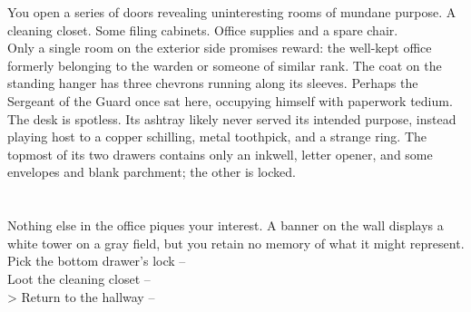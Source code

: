 You open a series of doors revealing uninteresting rooms of mundane purpose. A cleaning closet. Some filing cabinets. Office supplies and a spare chair.\\

Only a single room on the exterior side promises reward: the well-kept office formerly belonging to the warden or someone of similar rank. The coat on the standing hanger has three chevrons running along its sleeves. Perhaps the Sergeant of the Guard once sat here, occupying himself with paperwork tedium.\\

The desk is spotless. Its ashtray likely never served its intended purpose, instead playing host to a copper schilling, metal toothpick, and a strange ring. The topmost of its two drawers contains only an inkwell, letter opener, and some envelopes and blank parchment; the other is locked.\\
\\
\\

Nothing else in the office piques your interest. A banner on the wall displays a white tower on a gray field, but you retain no memory of what it might represent.\\

 Pick the bottom drawer's lock -- \\
 Loot the cleaning closet -- \\
> Return to the hallway -- 